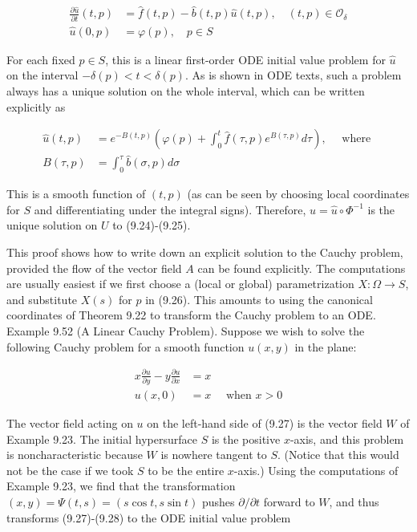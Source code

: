 \documentclass[10pt]{article}
\begin{document}
$$
\begin{aligned}
\frac{\partial \widehat{u}}{\partial t}(t, p) & =\widehat{f}(t, p)-\widehat{b}(t, p) \widehat{u}(t, p), \quad(t, p) \in \mathcal{O}_{\delta} \\
\widehat{u}(0, p) & =\varphi(p), \quad p \in S
\end{aligned}
$$

For each fixed $p \in S$, this is a linear first-order ODE initial value problem for $\widehat{u}$ on the interval $-\delta(p)<t<\delta(p)$. As is shown in ODE texts, such a problem always has a unique solution on the whole interval, which can be written explicitly as

$$
\begin{aligned}
\widehat{u}(t, p) & =e^{-B(t, p)}\left(\varphi(p)+\int_{0}^{t} \widehat{f}(\tau, p) e^{B(\tau, p)} d \tau\right), \quad \text { where } \\
B(\tau, p) & =\int_{0}^{\tau} \widehat{b}(\sigma, p) d \sigma
\end{aligned}
$$

This is a smooth function of $(t, p)$ (as can be seen by choosing local coordinates for $S$ and differentiating under the integral signs). Therefore, $u=\widehat{u} \circ \Phi^{-1}$ is the unique solution on $U$ to (9.24)-(9.25).

This proof shows how to write down an explicit solution to the Cauchy problem, provided the flow of the vector field $A$ can be found explicitly. The computations are usually easiest if we first choose a (local or global) parametrization $X: \Omega \rightarrow S$, and substitute $X(s)$ for $p$ in (9.26). This amounts to using the canonical coordinates of Theorem 9.22 to transform the Cauchy problem to an ODE.\\
Example 9.52 (A Linear Cauchy Problem). Suppose we wish to solve the following Cauchy problem for a smooth function $u(x, y)$ in the plane:

$$
\begin{aligned}
x \frac{\partial u}{\partial y}-y \frac{\partial u}{\partial x} & =x \\
u(x, 0) & =x \quad \text { when } x>0
\end{aligned}
$$

The vector field acting on $u$ on the left-hand side of (9.27) is the vector field $W$ of Example 9.23. The initial hypersurface $S$ is the positive $x$-axis, and this problem is noncharacteristic because $W$ is nowhere tangent to $S$. (Notice that this would not be the case if we took $S$ to be the entire $x$-axis.) Using the computations of Example 9.23, we find that the transformation $(x, y)=\Psi(t, s)=(s \cos t, s \sin t)$ pushes $\partial / \partial t$ forward to $W$, and thus transforms (9.27)-(9.28) to the ODE initial value problem
\end{document}
